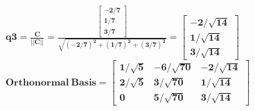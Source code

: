 \documentclass{article}%
\begin{document}
\begin{enumerate}
    $\mathbf{q3 = \frac{C}{||C||} = \frac{\begin{bmatrix} -2/7 \\ 1/7 \\ 3/7 \end{bmatrix}}{\sqrt{(-2/7)^2 + (1/7)^2 + (3/7)^2}} = \begin{bmatrix} -2/\sqrt{14} \\ 1/\sqrt{14} \\ 3/\sqrt{14}  \end{bmatrix} }$ \\
    $\mathbf{Orthonormal \ Basis = \begin{bmatrix} 1/\sqrt{5} & -6/\sqrt{70} & -2/\sqrt{14} \\ 2/\sqrt{5} & 3/\sqrt{70} & 1/\sqrt{14} \\ 0 & 5/\sqrt{70} & 3/\sqrt{14} \end{bmatrix}} $

    
\end{enumerate}
\end{document}

